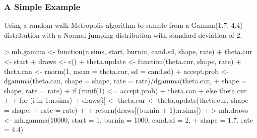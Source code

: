 \documentclass{beamer}
\begin{document}
\begin{frame}[fragile]
\frametitle{A Simple Example}
\pause
Using a random walk Metropolis algorithm to sample from a Gamma(1.7,
4.4) distribution with a Normal jumping distribution with standard
deviation of 2.
\medskip
\pause
\tiny
\begin{Schunk}
\begin{Sinput}
> mh.gamma <- function(n.sims, start, burnin, cand.sd, shape, rate) {
+     theta.cur <- start
+     draws <- c()
+     theta.update <- function(theta.cur, shape, rate) {
+         theta.can <- rnorm(1, mean = theta.cur, sd = cand.sd)
+         accept.prob <- dgamma(theta.can, shape = shape, rate = rate)/dgamma(theta.cur, 
+             shape = shape, rate = rate)
+         if (runif(1) <= accept.prob) 
+             theta.can
+         else theta.cur
+     }
+     for (i in 1:n.sims) {
+         draws[i] <- theta.cur <- theta.update(theta.cur, shape = shape, 
+             rate = rate)
+     }
+     return(draws[(burnin + 1):n.sims])
+ }
> mh.draws <- mh.gamma(10000, start = 1, burnin = 1000, cand.sd = 2, 
+     shape = 1.7, rate = 4.4)
\end{Sinput}
\end{Schunk}
\end{frame}
\end{document}
